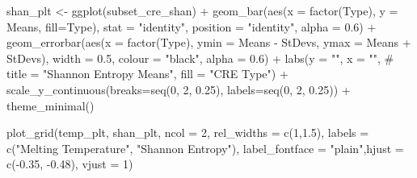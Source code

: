 \documentclass[
  letterpaper,
  DIV=11,
  numbers=noendperiod]{scrartcl}
\newenvironment{Shaded}{\begin{snugshade}}{\end{snugshade}}
\newcommand{\AttributeTok}[1]{\textcolor[rgb]{0.40,0.45,0.13}{#1}}
\newcommand{\CommentTok}[1]{\textcolor[rgb]{0.37,0.37,0.37}{#1}}
\newcommand{\DecValTok}[1]{\textcolor[rgb]{0.68,0.00,0.00}{#1}}
\newcommand{\FloatTok}[1]{\textcolor[rgb]{0.68,0.00,0.00}{#1}}
\newcommand{\FunctionTok}[1]{\textcolor[rgb]{0.28,0.35,0.67}{#1}}
\newcommand{\NormalTok}[1]{\textcolor[rgb]{0.00,0.23,0.31}{#1}}
\newcommand{\OtherTok}[1]{\textcolor[rgb]{0.00,0.23,0.31}{#1}}
\newcommand{\SpecialCharTok}[1]{\textcolor[rgb]{0.37,0.37,0.37}{#1}}
\newcommand{\StringTok}[1]{\textcolor[rgb]{0.13,0.47,0.30}{#1}}
\begin{document}
\begin{Shaded}
\begin{Highlighting}[]
\NormalTok{shan\_plt }\OtherTok{\textless{}{-}} \FunctionTok{ggplot}\NormalTok{(subset\_cre\_shan) }\SpecialCharTok{+}
  \FunctionTok{geom\_bar}\NormalTok{(}\FunctionTok{aes}\NormalTok{(}\AttributeTok{x =} \FunctionTok{factor}\NormalTok{(Type), }
               \AttributeTok{y =}\NormalTok{ Means, }\AttributeTok{fill=}\NormalTok{Type),}
           \AttributeTok{stat =} \StringTok{"identity"}\NormalTok{, }\AttributeTok{position =} \StringTok{"identity"}\NormalTok{, }\AttributeTok{alpha =} \FloatTok{0.6}\NormalTok{) }\SpecialCharTok{+}
  \FunctionTok{geom\_errorbar}\NormalTok{(}\FunctionTok{aes}\NormalTok{(}\AttributeTok{x =} \FunctionTok{factor}\NormalTok{(Type), }
                    \AttributeTok{ymin =}\NormalTok{ Means }\SpecialCharTok{{-}}\NormalTok{ StDevs,}
                    \AttributeTok{ymax =}\NormalTok{ Means }\SpecialCharTok{+}\NormalTok{ StDevs),}
                \AttributeTok{width =} \FloatTok{0.5}\NormalTok{, }\AttributeTok{colour =} \StringTok{"black"}\NormalTok{, }\AttributeTok{alpha =} \FloatTok{0.6}\NormalTok{) }\SpecialCharTok{+}
  \FunctionTok{labs}\NormalTok{(}\AttributeTok{y =} \StringTok{""}\NormalTok{, }\AttributeTok{x =} \StringTok{""}\NormalTok{, }
       \CommentTok{\# title = "Shannon Entropy Means", }
       \AttributeTok{fill =} \StringTok{"CRE Type"}\NormalTok{) }\SpecialCharTok{+}
  \FunctionTok{scale\_y\_continuous}\NormalTok{(}\AttributeTok{breaks=}\FunctionTok{seq}\NormalTok{(}\DecValTok{0}\NormalTok{, }\DecValTok{2}\NormalTok{, }\FloatTok{0.25}\NormalTok{), }\AttributeTok{labels=}\FunctionTok{seq}\NormalTok{(}\DecValTok{0}\NormalTok{, }\DecValTok{2}\NormalTok{, }\FloatTok{0.25}\NormalTok{)) }\SpecialCharTok{+}
  \FunctionTok{theme\_minimal}\NormalTok{()}

\FunctionTok{plot\_grid}\NormalTok{(temp\_plt, shan\_plt, }\AttributeTok{ncol =} \DecValTok{2}\NormalTok{, }\AttributeTok{rel\_widths =} \FunctionTok{c}\NormalTok{(}\DecValTok{1}\NormalTok{,}\FloatTok{1.5}\NormalTok{),}
          \AttributeTok{labels =} \FunctionTok{c}\NormalTok{(}\StringTok{"Melting Temperature"}\NormalTok{, }\StringTok{"Shannon Entropy"}\NormalTok{),}
          \AttributeTok{label\_fontface =} \StringTok{"plain"}\NormalTok{,}\AttributeTok{hjust =} \FunctionTok{c}\NormalTok{(}\SpecialCharTok{{-}}\FloatTok{0.35}\NormalTok{, }\SpecialCharTok{{-}}\FloatTok{0.48}\NormalTok{), }\AttributeTok{vjust =} \DecValTok{1}\NormalTok{)}
\end{Highlighting}
\end{Shaded}
\end{document}
